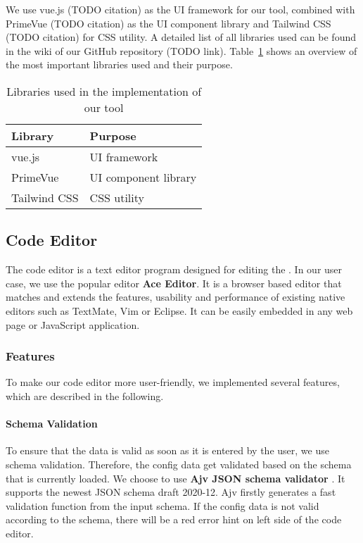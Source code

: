We use vue.js (TODO citation) as the UI framework for our tool, combined with PrimeVue (TODO citation) as the UI component library and Tailwind CSS (TODO citation) for CSS utility.
A detailed list of all libraries used can be found in the wiki of our GitHub repository (TODO link).
Table~\ref{tab:libraries} shows an overview of the most important libraries used and their purpose.

\begin{table}[!t]
    \caption{Libraries used in the implementation of our tool}
    \label{tab:libraries}
    \centering
    \begin{tabular}{ll}
        \toprule
        \textbf{Library} & \textbf{Purpose}     \\
        \midrule
        vue.js           & UI framework         \\
        PrimeVue         & UI component library \\
        Tailwind CSS     & CSS utility          \\
        \bottomrule
    \end{tabular}
\end{table}

\subsection{Code Editor}\label{subsec:code-editor}

The code editor is a text editor program designed for editing the \cfgfiles.
In our user case, we use the popular editor \textbf{Ace Editor}. \cite{Ace-Editor}
It is a browser based editor that matches and extends the features, usability and performance of existing native editors such as TextMate, Vim or Eclipse.
It can be easily embedded in any web page or JavaScript application.

\subsubsection{Features}

To make our code editor more user-friendly, we implemented several features, which are described in the following.

\paragraph{Schema Validation}
To ensure that the data is valid as soon as it is entered by the user, we use schema validation.
Therefore, the config data get validated based on the schema that is currently loaded.
We choose to use \textbf{Ajv JSON schema validator} \cite{ajv-validator}.
It supports the newest JSON schema draft 2020-12.
Ajv firstly generates a fast validation function from the input schema.
If the config data is not valid according to the schema, there will be a red error hint on left side of the code editor.

